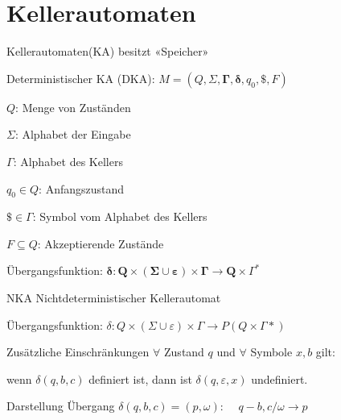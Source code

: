 \graphicspath{{images/}}
\section*{Kellerautomaten}

\begin{definition}{Kellerautomaten}(KA) besitzt «Speicher»

    Deterministischer KA (DKA): $M=\left(Q, \Sigma, \boldsymbol{\Gamma}, \boldsymbol{\delta}, q_{0}, \$, F\right)$
    
    \begin{minipage}{0.4\linewidth}
        $Q$: Menge von Zuständen

        $\Sigma$: Alphabet der Eingabe

        $\Gamma$: Alphabet des Kellers
    \end{minipage}
    \begin{minipage}{0.6\linewidth}
        $q_{0} \in Q$: Anfangszustand

        $\$ \in \Gamma$: Symbol vom Alphabet des Kellers

        $F \subseteq Q$: Akzeptierende Zustände
    \end{minipage}

    Übergangsfunktion: $\boldsymbol{\delta}: \boldsymbol{Q} \times(\boldsymbol{\Sigma} \cup \boldsymbol{\varepsilon}) \times \boldsymbol{\Gamma} \rightarrow \boldsymbol{Q} \times \Gamma^{*}$

\end{definition}

\begin{KR}{NKA} Nichtdeterministischer Kellerautomat

    Übergangsfunktion: $\delta: Q \times(\Sigma \cup \varepsilon) \times \Gamma \rightarrow P(Q \times \Gamma *)$
\end{KR}



\begin{concept}{Zusätzliche Einschränkungen}
    $\forall$ Zustand $q$ und $\forall$ Symbole $x, b$ gilt:
    
    wenn $\delta(q, b, c)$ definiert ist, dann ist $\delta(q, \varepsilon, x)$ undefiniert.

    \vspace*{1mm}

    Darstellung Übergang $\delta(q, b, c)=(p, \omega)$: \emph{$\quad q -b, c / \omega \longrightarrow p$}
\end{concept}

